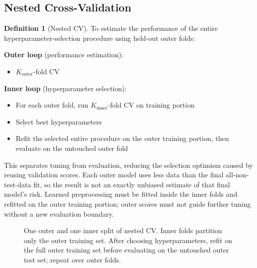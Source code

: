 \documentclass[11pt,twoside]{article}
\numberwithin{equation}{section}
\theoremstyle{plain}
\theoremstyle{definition}
\newtheorem{definition}[theorem]{Definition}
\theoremstyle{remark}
\begin{document}
\subsection{Nested Cross-Validation}

\begin{definition}[Nested CV]
To estimate the performance of the entire hyperparameter-selection procedure using held-out outer folds:

\textbf{Outer loop} (performance estimation):
\begin{itemize}
\item $K_{\text{outer}}$-fold CV
\end{itemize}

\textbf{Inner loop} (hyperparameter selection):
\begin{itemize}
\item For each outer fold, run $K_{\text{inner}}$-fold CV on training portion
\item Select best hyperparameters
\item Refit the selected entire procedure on the outer training portion, then evaluate on the untouched outer fold
\end{itemize}

This separates tuning from evaluation, reducing the selection optimism caused by reusing validation scores. Each outer model uses less data than the final all-non-test-data fit, so the result is not an exactly unbiased estimate of that final model's risk. Learned preprocessing must be fitted inside the inner folds and refitted on the outer training portion; outer scores must not guide further tuning without a new evaluation boundary.
\end{definition}

\begin{figure}[H]
\centering
{}
\caption{One outer and one inner split of nested CV. Inner folds partition only the outer training set. After choosing hyperparameters, refit on the full outer training set before evaluating on the untouched outer test set; repeat over outer folds.}
\end{figure}
\end{document}
